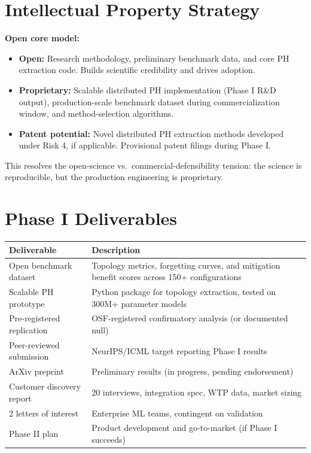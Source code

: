 \documentclass[11pt,letterpaper]{article}
\begin{document}
\section{Intellectual Property Strategy}

\textbf{Open core model:}
\begin{itemize}[nosep]
  \item \textbf{Open:} Research methodology, preliminary benchmark data, and core PH extraction code. Builds scientific credibility and drives adoption.
  \item \textbf{Proprietary:} Scalable distributed PH implementation (Phase I R\&D output), production-scale benchmark dataset during commercialization window, and method-selection algorithms.
  \item \textbf{Patent potential:} Novel distributed PH extraction methods developed under Risk 4, if applicable. Provisional patent filings during Phase I.
\end{itemize}

This resolves the open-science vs.\ commercial-defensibility tension: the science is reproducible, but the production engineering is proprietary.

\section{Phase I Deliverables}

\begin{center}
\begin{tabular}{@{}p{4.5cm}p{10cm}@{}}
\toprule
\textbf{Deliverable} & \textbf{Description} \\
\midrule
Open benchmark dataset & Topology metrics, forgetting curves, and mitigation benefit scores across 150+ configurations \\
Scalable PH prototype & Python package for topology extraction, tested on 300M+ parameter models \\
Pre-registered replication & OSF-registered confirmatory analysis (or documented null) \\
Peer-reviewed submission & NeurIPS/ICML target reporting Phase I results \\
ArXiv preprint & Preliminary results (in progress, pending endorsement) \\
Customer discovery report & 20 interviews, integration spec, WTP data, market sizing \\
2 letters of interest & Enterprise ML teams, contingent on validation \\
Phase II plan & Product development and go-to-market (if Phase I succeeds) \\
\bottomrule
\end{tabular}
\end{center}
\end{document}
